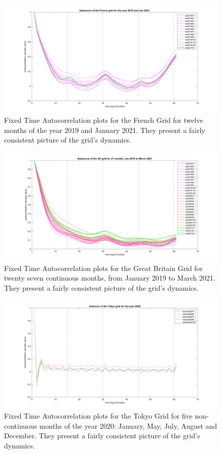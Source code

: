 \begin{figure}[!ht]
	\includegraphics[scale=0.25]{../figures/autocorr/fautocorrs_rte_201901_to_201912_202101}
		\caption{Fixed Time Autocorrelation plots for the French Grid for twelve months of the year 2019 and January 2021. They present a fairly consistent picture of the grid's dynamics.}
\end{figure}

\begin{figure}[!ht]
	\includegraphics[scale=0.25]{../figures/autocorr/fautocorrs_uk_201901_to_202103_2}
	\caption{Fixed Time Autocorrelation plots for the Great Britain Grid for twenty seven continuous months, from January 2019 to March 2021. They present a fairly consistent picture of the grid's dynamics.}
\end{figure}

\begin{figure}[!ht]
	\includegraphics[scale=0.25]{../figures/autocorr/fautocorrs_tokyo_202001_to_202012}
	\caption{Fixed Time Autocorrelation plots for the Tokyo Grid for five non-continuous months of the year 2020: January, May, July, August and December. They present a fairly consistent picture of the grid's dynamics.}
\end{figure}

